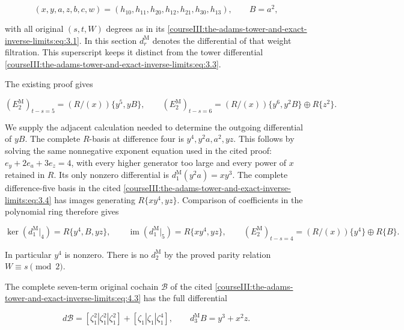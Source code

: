 \begin{equation}
(x,y,a,z,b,c,w)=(h_{10},h_{11},h_{20},h_{12},h_{21},h_{30},h_{13}),
 \qquad B=a^2,
 \label{courseIII:the-adams-tower-and-exact-inverse-limits:eq:5.1}
\end{equation}

with all original \((s,t,W)\) degrees as in its \eqref{courseIII:the-adams-tower-and-exact-inverse-limits:eq:3.1}. In this section \(d_r^{\mathrm M}\) denotes the differential of that weight filtration. This superscript keeps it distinct from the tower differential \eqref{courseIII:the-adams-tower-and-exact-inverse-limits:eq:3.3}.

The existing proof gives

\begin{equation}
(E_2^{\mathrm M})_{t-s=5}=(R/(x))\{y^5,yB\},
 \qquad (E_2^{\mathrm M})_{t-s=6}
       =(R/(x))\{y^6,y^2B\}\oplus R\{z^2\}.
 \label{courseIII:the-adams-tower-and-exact-inverse-limits:eq:5.2}
\end{equation}

We supply the adjacent calculation needed to determine the outgoing differential of \(yB\). The complete \(R\)-basis at difference four is
\(y^4,y^2a,a^2,yz\).
This follows by solving the same nonnegative exponent equation used in the cited proof: \(e_y+2e_a+3e_z=4\), with every higher generator too large and every power of \(x\) retained in \(R\). Its only nonzero differential is
\(d_1^{\mathrm M}(y^2a)=xy^3\).
The complete difference-five basis in the cited \eqref{courseIII:the-adams-tower-and-exact-inverse-limits:eq:3.4} has images generating
\(R\{xy^4,yz\}\).
Comparison of coefficients in the polynomial ring therefore gives

\begin{equation}
\ker(d_1^{\mathrm M}|_4)=R\{y^4,B,yz\},\qquad
 \operatorname{im}(d_1^{\mathrm M}|_5)=R\{xy^4,yz\},\qquad
 (E_2^{\mathrm M})_{t-s=4}=(R/(x))\{y^4\}\oplus R\{B\}.
 \label{courseIII:the-adams-tower-and-exact-inverse-limits:eq:5.3}
\end{equation}

In particular \(y^4\) is nonzero. There is no \(d_2^{\mathrm M}\) by the proved parity relation \(W\equiv s\pmod2\).

The complete seven-term original cochain \(\mathcal B\) of the cited \eqref{courseIII:the-adams-tower-and-exact-inverse-limits:eq:4.3} has the full differential

\begin{equation}
d\mathcal B=[\zeta_1^2|\zeta_1^2|\zeta_1^2]
                   +[\zeta_1|\zeta_1|\zeta_1^4],
 \qquad d_3^{\mathrm M}B=y^3+x^2z.
 \label{courseIII:the-adams-tower-and-exact-inverse-limits:eq:5.4}
\end{equation}

